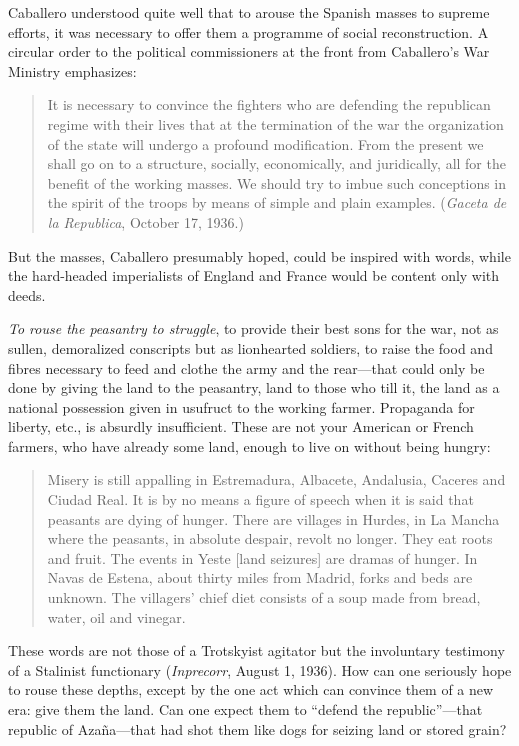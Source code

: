Caballero understood quite well that to arouse the Spanish masses to supreme efforts, it was necessary to offer them a programme of social reconstruction. A circular order to the political commissioners at the front from Caballero’s War Ministry emphasizes:
\begin{quote}
  It is necessary to convince the fighters who are defending the republican regime with their lives that at the termination of the war the organization of the state will undergo a profound modification. From the present we shall go on to a structure, socially, economically, and juridically, all for the benefit of the working masses. We should try to imbue such conceptions in the spirit of the troops by means of simple and plain examples. (\emph{Gaceta de la Republica}, October 17, 1936.)
\end{quote}

But the masses, Caballero presumably hoped, could be inspired with words, while the hard-headed imperialists of England and France would be content only with deeds.

\emph{To rouse the peasantry to struggle}, to provide their best sons for the war, not as sullen, demoralized conscripts but as lionhearted soldiers, to raise the food and fibres necessary to feed and clothe the army and the rear---that could only be done by giving the land to the peasantry, land to those who till it, the land as a national possession given in usufruct to the working farmer. Propaganda for liberty, etc., is absurdly insufficient. These are not your American or French farmers, who have already some land, enough to live on without being hungry:
\begin{quote}
  Misery is still appalling in Estremadura, Albacete, Andalusia, Caceres and Ciudad Real. It is by no means a figure of speech when it is said that peasants are dying of hunger. There are villages in Hurdes, in La Mancha where the peasants, in absolute despair, revolt no longer. They eat roots and fruit. The events in Yeste [land seizures] are dramas of hunger. In Navas de Estena, about thirty miles from Madrid, forks and beds are unknown. The villagers’ chief diet consists of a soup made from bread, water, oil and vinegar.
\end{quote}
These words are not those of a Trotskyist agitator but the involuntary testimony of a Stalinist functionary (\emph{Inprecorr}, August 1, 1936). How can one seriously hope to rouse these depths, except by the one act which can convince them of a new era: give them the land. Can one expect them to ``defend the republic''---that republic of Azaña---that had shot them like dogs for seizing land or stored grain?

